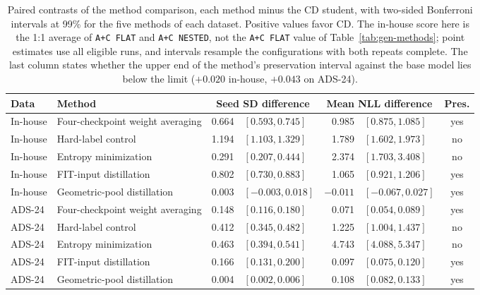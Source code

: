 \begin{table}[htbp]
\centering
\caption[Paired contrasts of the method comparison]{Paired contrasts of the method comparison, each method minus
the CD student, with two-sided Bonferroni intervals at 99\% for the
five methods of each dataset. Positive values favor CD. The in-house
score here is the 1:1 average of \texttt{A+C FLAT} and
\texttt{A+C NESTED}, not the \texttt{A+C FLAT} value of
Table~\ref{tab:gen-methods}; point estimates use all eligible runs, and
intervals resample the configurations with both repeats complete. The
last column states whether the upper end of the method's preservation
interval against the base model lies below the limit ($+0.020$ in-house,
$+0.043$ on ADS-24).}
\label{tab:gen-methods-contrast}
\small
\begin{tabular}{@{}llrlrlc@{}}
\toprule
Data & Method & \multicolumn{2}{c}{Seed SD difference}
 & \multicolumn{2}{c}{Mean NLL difference} & Pres. \\
\midrule
In-house & Four-checkpoint weight averaging & 0.664 & $[0.593, 0.745]$ & 0.985 & $[0.875, 1.085]$ & yes \\
In-house & Hard-label control     & 1.194 & $[1.103, 1.329]$ & 1.789 & $[1.602, 1.973]$ & no \\
In-house & Entropy minimization   & 0.291 & $[0.207, 0.444]$ & 2.374 & $[1.703, 3.408]$ & no \\
In-house & FIT-input distillation & 0.802 & $[0.730, 0.883]$ & 1.065 & $[0.921, 1.206]$ & yes \\
In-house & Geometric-pool distillation & 0.003 & $[-0.003, 0.018]$ & $-0.011$ & $[-0.067, 0.027]$ & yes \\
\midrule
ADS-24 & Four-checkpoint weight averaging & 0.148 & $[0.116, 0.180]$ & 0.071 & $[0.054, 0.089]$ & yes \\
ADS-24 & Hard-label control     & 0.412 & $[0.345, 0.482]$ & 1.225 & $[1.004, 1.437]$ & no \\
ADS-24 & Entropy minimization   & 0.463 & $[0.394, 0.541]$ & 4.743 & $[4.088, 5.347]$ & no \\
ADS-24 & FIT-input distillation & 0.166 & $[0.131, 0.200]$ & 0.097 & $[0.075, 0.120]$ & yes \\
ADS-24 & Geometric-pool distillation & 0.004 & $[0.002, 0.006]$ & 0.108 & $[0.082, 0.133]$ & yes \\
\bottomrule
\end{tabular}
\end{table}
